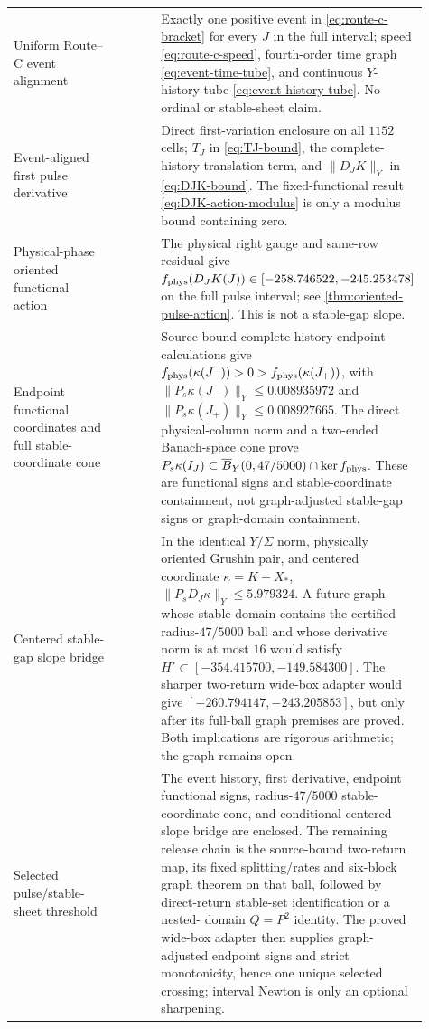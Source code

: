 \begin{longtable}{@{}L{0.28\linewidth}L{0.15\linewidth}L{0.48\linewidth}@{}}
Uniform Route--C event alignment
& 
& Exactly one positive event in \cref{eq:route-c-bracket} for every
  \(J\) in the full interval; speed \cref{eq:route-c-speed}, fourth-order
  time graph \cref{eq:event-time-tube}, and continuous \(Y\)-history tube
  \cref{eq:event-history-tube}.  No ordinal or stable-sheet claim.\\

Event-aligned first pulse derivative
& 
& Direct first-variation enclosure on all \(1152\) cells;
  \(T_J\) in \cref{eq:TJ-bound}, the complete-history translation term,
  and \(\|D_JK\|_Y\) in \cref{eq:DJK-bound}.  The fixed-functional result
  \cref{eq:DJK-action-modulus} is only a modulus bound containing zero.\\

Physical-phase oriented functional action
& 
& The physical right gauge and same-row residual give
  \(f_{\rm phys}(D_JK(J))\in[-258.746522,-245.253478]\) on the full pulse
  interval; see \cref{thm:oriented-pulse-action}.  This is not a stable-gap
  slope.\\

Endpoint functional coordinates and full stable-coordinate cone
& 
& Source-bound complete-history endpoint calculations give
  \(f_{\rm phys}(\kappa(J_-))>0>f_{\rm phys}(\kappa(J_+))\), with
  \(\|P_s\kappa(J_-)\|_Y\le0.008935972\) and
  \(\|P_s\kappa(J_+)\|_Y\le0.008927665\).  The direct physical-column norm
  and a two-ended Banach-space cone prove
  \(P_s\kappa(I_J)\subset\overline B_Y(0,47/5000)\cap\ker f_{\rm phys}\).
  These are functional signs and stable-coordinate containment, not
  graph-adjusted stable-gap signs or graph-domain containment.\\

Centered stable-gap slope bridge
& 
& In the identical \(Y/\Sigma\) norm, physically oriented Grushin pair, and
  centered coordinate \(\kappa=K-X_*\),
  \(\|P_sD_J\kappa\|_Y\le5.979324\).  A future graph whose stable domain
  contains the certified radius-\(47/5000\) ball and whose derivative norm
  is at most \(16\) would satisfy
  \(H'\subset[-354.415700,-149.584300]\).  The sharper two-return wide-box
  adapter would give \([-260.794147,-243.205853]\), but only after its
  full-ball graph premises are proved.  Both implications are rigorous
  arithmetic; the graph remains open.\\

Selected pulse/stable-sheet threshold
& 
& The event history, first derivative, endpoint functional signs,
  radius-\(47/5000\) stable-coordinate cone, and conditional centered slope
  bridge are enclosed.  The remaining release chain is the source-bound
  two-return map, its fixed splitting/rates and six-block graph theorem on
  that ball, followed by direct-return stable-set identification or a nested-
  domain \(Q=P^2\) identity.  The proved wide-box adapter then supplies
  graph-adjusted endpoint signs and strict monotonicity, hence one unique
  selected crossing; interval Newton is only an optional sharpening.\\


\end{longtable}
